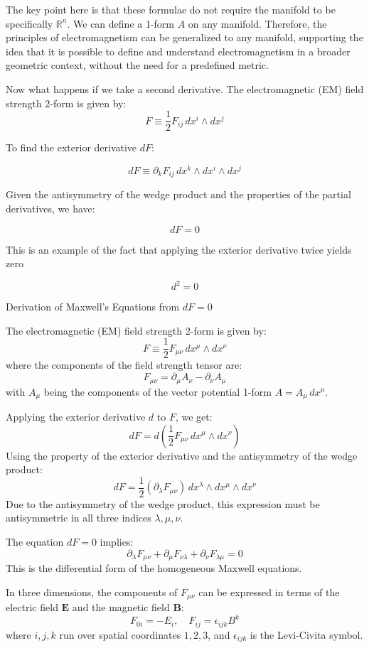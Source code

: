 \documentclass{article}
\begin{document}
The key point here is that these formulae do not require the manifold to be specifically \(\mathbb{R}^n\). We can define a 1-form \( A \) on any manifold. Therefore, the principles of electromagnetism can be generalized to any manifold, supporting the idea that it is possible to define and understand electromagnetism in a broader geometric context, without the need for a predefined metric.

Now what happens if we take a second derivative. 
The electromagnetic (EM) field strength 2-form is given by:
\[
F \equiv \frac{1}{2} F_{ij} \, dx^i \wedge dx^j
\]

To find the exterior derivative \( dF \):

\[
dF \equiv \partial_k F_{ij} \, dx^k \wedge dx^i \wedge dx^j
\]

Given the antisymmetry of the wedge product and the properties of the partial derivatives, we have:

\[
dF = 0
\]

This is an example of the fact that applying the exterior derivative twice yields zero

\[
d^2 = 0
\]

Derivation of Maxwell's Equations from \(dF = 0\)

The electromagnetic (EM) field strength 2-form is given by:
\[
F \equiv \frac{1}{2} F_{\mu\nu} \, dx^\mu \wedge dx^\nu
\]
where the components of the field strength tensor are:
\[
F_{\mu\nu} = \partial_\mu A_\nu - \partial_\nu A_\mu
\]
with \(A_\mu\) being the components of the vector potential 1-form \(A = A_\mu \, dx^\mu\).

Applying the exterior derivative \(d\) to \(F\), we get:
\[
dF = d \left(\frac{1}{2} F_{\mu\nu} \, dx^\mu \wedge dx^\nu\right)
\]
Using the property of the exterior derivative and the antisymmetry of the wedge product:
\[
dF = \frac{1}{2} (\partial_\lambda F_{\mu\nu}) \, dx^\lambda \wedge dx^\mu \wedge dx^\nu
\]
Due to the antisymmetry of the wedge product, this expression must be antisymmetric in all three indices \(\lambda, \mu, \nu\).

The equation \(dF = 0\) implies:
\[
\partial_\lambda F_{\mu\nu} + \partial_\mu F_{\nu\lambda} + \partial_\nu F_{\lambda\mu} = 0
\]
This is the differential form of the homogeneous Maxwell equations.

In three dimensions, the components of \(F_{\mu\nu}\) can be expressed in terms of the electric field \(\mathbf{E}\) and the magnetic field \(\mathbf{B}\):
\[
F_{0i} = -E_i, \quad F_{ij} = \epsilon_{ijk} B^k
\]
where \(i, j, k\) run over spatial coordinates \(1, 2, 3\), and \(\epsilon_{ijk}\) is the Levi-Civita symbol.
\end{document}
